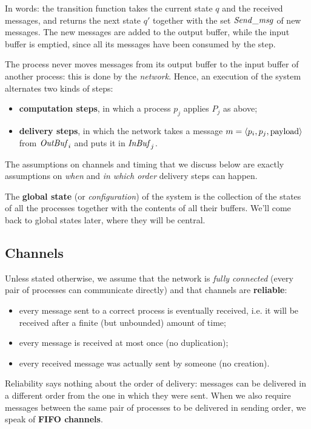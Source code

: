 In words: the transition function takes the current state $q$ and the received messages, and returns the next state $q'$ together with the set $\mathit{Send\_msg}$ of new messages. The new messages are added to the output buffer, while the input buffer is emptied, since all its messages have been consumed by the step.

\begin{framedobs}{}
  The process never moves messages from its output buffer to the input buffer of another process: this is done by the \textit{network}. Hence, an execution of the system alternates two kinds of steps:
  \begin{itemize}
    \item \textbf{computation steps}, in which a process $p_j$ applies $P_j$ as above;
    \item \textbf{delivery steps}, in which the network takes a message $m = \left\langle p_i, p_j, \text{payload} \right\rangle$ from $\mathit{OutBuf}_i$ and puts it in $\mathit{InBuf}_j$.
  \end{itemize}
  The assumptions on channels and timing that we discuss below are exactly assumptions on \textit{when} and \textit{in which order} delivery steps can happen.
\end{framedobs}

The \textbf{global state} (or \textit{configuration}) of the system is the collection of the states of all the processes together with the contents of all their buffers. We'll come back to global states later, where they will be central.

\subsection{Channels}
Unless stated otherwise, we assume that the network is \textit{fully connected} (every pair of processes can communicate directly) and that channels are \textbf{reliable}:
\begin{itemize}
  \item every message sent to a correct process is eventually received, i.e. it will be received after a finite (but unbounded) amount of time;
  \item every message is received at most once (no duplication);
  \item every received message was actually sent by someone (no creation).
\end{itemize}
Reliability says nothing about the order of delivery: messages can be delivered in a different order from the one in which they were sent. When we also require messages between the same pair of processes to be delivered in sending order, we speak of \textbf{FIFO channels}.

